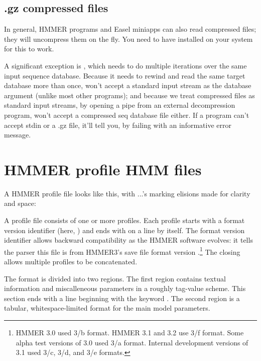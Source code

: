 \subsection{.gz compressed files}

In general, HMMER programs and Easel miniapps can also read 
compressed files; they will uncompress them on the fly. You need to
have  installed on your system for this to work.

A significant exception is , which needs to do
multiple iterations over the same input sequence database. Because it
needs to rewind and read the same target database more than once,
 won't accept a standard input stream as the database
argument (unlike most other programs); and because we treat compressed
files as standard input streams, by opening a pipe from an external
decompression program,  won't accept a compressed seq
database file either. If a program can't accept stdin or a .gz file,
it'll tell you, by failing with an informative error message.



\newpage
\section{HMMER profile HMM files}
\label{section:savefiles}

A HMMER profile file looks like this, with ...'s marking elisions made
for clarity and space:


A profile file consists of one or more profiles.  Each profile starts
with a format version identifier (here, ) and ends with
\mono{//} on a line by itself.  The format version identifier allows
backward compatibility as the HMMER software evolves: it tells the
parser this file is from HMMER3's save file format version
\HMMERfmtversion{}.\footnote{HMMER 3.0 used 3/b format. HMMER 3.1 and 3.2 use 3/f
  format.  Some alpha test versions of 3.0 used 3/a format. Internal
  development versions of 3.1 used 3/c, 3/d, and 3/e formats.}  The
closing \mono{//} allows multiple profiles to be concatenated.

The format is divided into two regions. The first region contains
textual information and miscalleneous parameters in a roughly
tag-value scheme.  This section ends with a line beginning with the
keyword . The second region is a tabular, whitespace-limited
format for the main model parameters.


